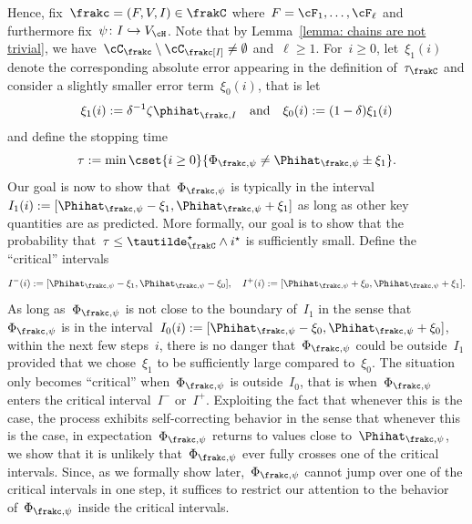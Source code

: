 \documentclass[11pt]{amsart}
\newcommand{\qtand}{\quad\text{and}\quad}
\newcommand{\injection}{\hookrightarrow}
\theoremstyle{definition}
\numberwithin{equation}{section}
\begin{document}
	Hence, fix~$\frakc=(F,V,I)\in\frakC$ where~$F=\cF_1,\ldots,\cF_\ell$ and furthermore fix~$\psi\colon I\injection V_\cH$.
	Note that by Lemma~\ref{lemma: chains are not trivial}, we have~$\cC_\frakc\setminus\cC_\frakc[I]\neq\emptyset$ and~$\ell\geq 1$.
	For~$i\geq 0$, let~$\xi_1(i)$ denote the corresponding absolute error appearing in the definition of~$\tau_\frakC$ and consider a slightly smaller error term~$\xi_0(i)$, that is let
	\begin{equation*}
		\xi_1(i):=\delta^{-1} \zeta\phihat_{\frakc,I}\qtand
		\xi_0(i):=(1-\delta) \xi_1(i)
	\end{equation*}
	and define the stopping time
	\begin{equation*}
		\tau:=\min\cset{i\geq 0}{ \Phi_{\frakc,\psi}\neq\Phihat_{\frakc,\psi}\pm \xi_1 }.
	\end{equation*}
	Our goal is now to show that~$\Phi_{\frakc,\psi}$ is typically in the interval~$I_1(i):=[\Phihat_{\frakc,\psi}-\xi_1, \Phihat_{\frakc,\psi}+\xi_1]$ as long as other key quantities are as predicted.
	More formally, our goal is to show that the probability that~$\tau\leq \tautilde_{\frakC}^\star\wedge i^\star$ is sufficiently small.
	Define the \enquote{critical} intervals
	\begin{equation*}
		I^-(i):=[\Phihat_{\frakc,\psi}-\xi_1,\Phihat_{\frakc,\psi}-\xi_0],\quad
		I^+(i):=[\Phihat_{\frakc,\psi}+\xi_0,\Phihat_{\frakc,\psi}+\xi_1].
	\end{equation*}
	As long as~$\Phi_{\frakc,\psi}$ is not close to the boundary of~$I_1$ in the sense that~$\Phi_{\frakc,\psi}$ is in the interval~$I_0(i):=[\Phihat_{\frakc,\psi}-\xi_0, \Phihat_{\frakc,\psi}+\xi_0]$, within the next few steps~$i$, there is no danger that~$\Phi_{\frakc,\psi}$ could be outside~$I_1$ provided that we chose~$\xi_1$ to be sufficiently large compared to~$\xi_0$.
	The situation only becomes \enquote{critical} when~$\Phi_{\frakc,\psi}$ is outside~$I_0$, that is when~$\Phi_{\frakc,\psi}$ enters the critical interval~$I^-$ or~$I^+$.
	Exploiting the fact that whenever this is the case, the process exhibits self-correcting behavior in the sense that whenever this is the case, in expectation~$\Phi_{\frakc,\psi}$ returns to values close to~$\Phihat_{\frakc,\psi}$, we show that it is unlikely that~$\Phi_{\frakc,\psi}$ ever fully crosses one of the critical intervals.
	Since, as we formally show later,~$\Phi_{\frakc,\psi}$ cannot jump over one of the critical intervals in one step, it suffices to restrict our attention to the behavior of~$\Phi_{\frakc,\psi}$ inside the critical intervals.
	
\end{document}
